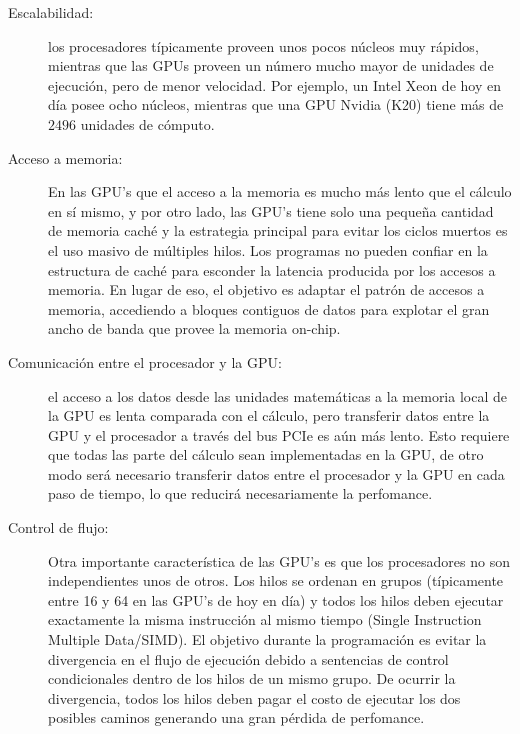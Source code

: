 \documentclass[a4paper,10pt]{article}
\begin{document}
\begin{description}
\item[Escalabilidad:] los procesadores t\'ipicamente proveen unos pocos n\'ucleos muy r\'apidos, mientras que las GPUs proveen un n\'umero mucho mayor de unidades de ejecuci\'on, pero de menor velocidad. Por ejemplo, un Intel Xeon de hoy en d\'ia posee ocho n\'ucleos, mientras que una GPU Nvidia (K20) tiene m\'as de $2496$ unidades de c\'omputo.

\item[Acceso a memoria:] En las GPU's que el acceso a la memoria es mucho m\'as lento que el c\'alculo en s\'i mismo, y por otro lado, las GPU's tiene solo una peque\~na cantidad de memoria cach\'e y la estrategia principal para evitar los ciclos muertos es el uso masivo de m\'ultiples hilos. Los programas no pueden confiar en la estructura de cach\'e para esconder la latencia producida por los accesos a memoria. En lugar de eso, el objetivo es adaptar el patr\'on de accesos a memoria, accediendo a bloques contiguos de datos para explotar el gran ancho de banda que provee la memoria on-chip.

\item[Comunicaci\'on entre el procesador y la GPU:] el acceso a los datos desde las unidades matem\'aticas a la memoria local de la GPU es lenta comparada con el c\'alculo, pero transferir datos entre la GPU y el procesador a trav\'es del bus PCIe es a\'un m\'as lento. Esto requiere que todas las parte del c\'alculo sean implementadas en la GPU, de otro modo ser\'a necesario transferir datos entre el procesador y la GPU en cada paso de tiempo, lo que reducir\'a necesariamente la perfomance.

\item [Control de flujo:] Otra importante caracter\'istica de las GPU's es que los procesadores no son independientes unos de otros. Los hilos se ordenan en grupos (t\'ipicamente entre 16 y 64 en las GPU's de hoy en d\'ia) y todos los hilos deben ejecutar exactamente la misma instrucci\'on al mismo tiempo (Single Instruction Multiple Data/SIMD). El objetivo durante la programaci\'on es evitar la divergencia en el flujo de ejecuci\'on debido a sentencias de control condicionales dentro de los hilos de un mismo grupo. De ocurrir la divergencia, todos los hilos deben pagar el costo de ejecutar los dos posibles caminos generando una gran p\'erdida de perfomance.
\end{description}
\end{document}
